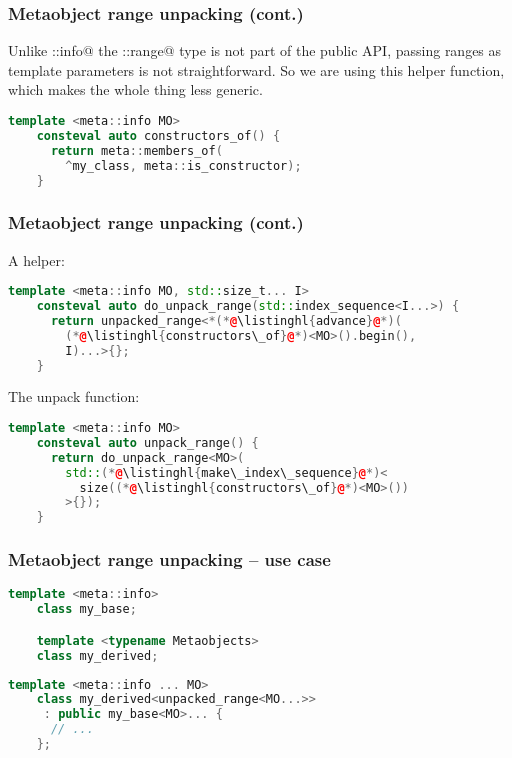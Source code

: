 \documentclass[compress,table,xcolor=table]{beamer}
\begin{document}
\begin{frame}[fragile]
    \frametitle{Metaobject range unpacking (cont.)}
  \Large
  Unlike \verb@meta::info@ the \verb@detail::range@ type is not part of the
    public API, passing ranges as template parameters is not straightforward.
  \vfill
  So we are using this helper function, which makes the whole thing less generic.
    \begin{lstlisting}[language=c++]
    template <meta::info MO>
    consteval auto constructors_of() {
      return meta::members_of(
        ^my_class, meta::is_constructor);
    }
    \end{lstlisting}
\end{frame}
\begin{frame}[fragile]
\frametitle{Metaobject range unpacking (cont.)}
    \large
    A helper:
    \begin{lstlisting}[language=c++]
    template <meta::info MO, std::size_t... I>
    consteval auto do_unpack_range(std::index_sequence<I...>) {
      return unpacked_range<*(*@\listinghl{advance}@*)(
        (*@\listinghl{constructors\_of}@*)<MO>().begin(),
        I)...>{};
    }
    \end{lstlisting}
    \vfill
    The unpack function:
    \begin{lstlisting}[language=c++]
    template <meta::info MO>
    consteval auto unpack_range() {
      return do_unpack_range<MO>(
        std::(*@\listinghl{make\_index\_sequence}@*)<
          size((*@\listinghl{constructors\_of}@*)<MO>())
        >{});
    }
    \end{lstlisting}
\end{frame}
\begin{frame}[fragile]
\frametitle{Metaobject range unpacking -- use case}
    \begin{lstlisting}[language=c++]
    template <meta::info>
    class my_base;

    template <typename Metaobjects>
    class my_derived;
    \end{lstlisting}

    \begin{lstlisting}[language=c++]
    template <meta::info ... MO>
    class my_derived<unpacked_range<MO...>>
     : public my_base<MO>... {
      // ...
    };
    \end{lstlisting}
\end{frame}
\end{document}
